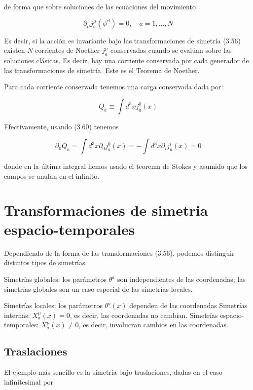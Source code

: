 de forma que sobre soluciones de las ecuaciones del movimiento

\begin{equation*}
\partial_{\mu} j_{a}^{\mu}\left(\phi^{c l}\right)=0, \quad a=1, \ldots, N \tag{3.60}
\end{equation*}


Es decir, si la acción es invariante bajo las transformaciones de simetría (3.56) existen $N$ corrientes de Noether $j_{a}^{\mu}$ conservadas cuando se evalúan sobre las soluciones clásicas. Es decir, hay una corriente conservada por cada generador de las transformaciones de simetría. Este es el Teorema de Noether.

Para cada corriente conservada tenemos una carga conservada dada por:

\begin{equation*}
Q_{a} \equiv \int d^{3} x j_{a}^{0}(x) \tag{3.61}
\end{equation*}


Efectivamente, usando (3.60) tenemos

\begin{equation*}
\partial_{0} Q_{a}=\int d^{3} x \partial_{0} j_{a}^{0}(x)=-\int d^{3} x \partial_{i} j_{a}^{i}(x)=0 \tag{3.62}
\end{equation*}

donde en la última integral hemos usado el teorema de Stokes y asumido que los campos se anulan en el infinito.
\section{Transformaciones de simetria espacio-temporales}
Dependiendo de la forma de las transformaciones (3.56), podemos distinguir distintos tipos de simetrías:

Simetrías globales: los parámetros $\theta^{a}$ son independientes de las coordenadas; las simetrías globales son un caso especial de las simetrías locales.

Simetrías locales: los parámetros $\theta^{a}(x)$ dependen de las coordenadas
Simetrías internas: $X_{a}^{\mu}(x)=0$, es decir, las coordenadas no cambian.
Simetrías espacio-temporales: $X_{a}^{\mu}(x) \neq 0$, es decir, involucran cambios en las coordenadas.
\subsection{Traslaciones}
El ejemplo más sencillo es la simetría bajo traslaciones, dadas en el caso infinitesimal por

